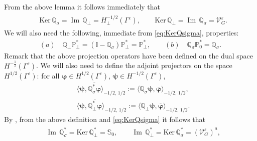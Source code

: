\documentclass[]{article}
\newtheorem{proposition}{Proposition}
\numberwithin{equation}{section}
\numberwithin{theorem}{section}
\numberwithin{lemma}{section}
\numberwithin{corollary}{section}
\numberwithin{proposition}{section}
\numberwithin{definition}{section}
\newcommand{\re}{\varepsilon}
\renewcommand{\vec}{\boldsymbol}
\renewcommand{\Im}{\operatorname{Im}}
\begin{document}
	From the above lemma it follows immediately that 
	\begin{align}
		\label{eq:KerQsigma}
		\begin{split}
			&\text{Ker} \, \mathbb{Q}_{\sigma} = \Im \, \mathbb{Q}_{\perp} = H^{-1/2}_{\perp}(\Gamma^{\re}), \qquad  \text{Ker} \, \mathbb{Q}_{\perp} = \Im \, \mathbb{Q}_{\sigma} = \mathcal{V}^{\re}_G.
		\end{split}
	\end{align}
	We will also need the following, immediate from  \eqref{eq:KerQsigma}, properties:
	\begin{align}
		\label{eq:qperp_pperp}
		(a)\quad	\mathbb{Q}_{\perp}\mathbb{P}_{\perp}^*=(\mathbb{I}-\mathbb{Q}_{\sigma})\mathbb{P}_{\perp}^*=\mathbb{P}_{\perp}^*,\qquad 
		(b)\quad \mathbb{Q}_{\sigma}\mathbb{P}_{0}^*=\mathbb{Q}_{\sigma}.
	\end{align}
	Remark that the above projection operators have been defined on the dual space $H^{-\frac{1}{2}}(\Gamma^{\re})$. We will also need to define the adjoint projectors on the space $H^{1/2}(\Gamma^{\re})$: for all  $\vec{\varphi}\in H^{1/2}(\Gamma^{\re}), \, \vec{\psi}\in H^{-1/2}(\Gamma^{\re})$, 
	\begin{align*}%
		&\langle \vec{\psi}, \overline{\mathbb{Q}^{*}_{\sigma} \vec{\varphi}} \rangle_{-1/2, \, 1/2} := \langle \mathbb{Q}_{\sigma} \vec{\psi},  \overline{\vec{\varphi}} \rangle_{-1/2, \, 1/2}, \\
		&\langle \vec{\psi}, \overline{\mathbb{Q}^{*}_{\perp} \vec{\varphi}} \rangle_{-1/2, \, 1/2} := \langle \mathbb{Q}_{\perp} \vec{\psi},  \overline{\vec{\varphi}} \rangle_{-1/2, \, 1/2}.
	\end{align*}
	By \cite[p. 23, Lemma 2.10]{mclean}, from the above definition and \eqref{eq:KerQsigma} it follows that 
	\begin{align}
		\label{eq:kerqperp}
		\begin{split}
			&\Im \, \mathbb{Q}^*_{\sigma} = \text{Ker} \, \mathbb{Q}^*_{\perp} = \mathbb{S}_0, \qquad \Im \, \mathbb{Q}^*_{\perp} = \text{Ker} \, \mathbb{Q}^*_{\sigma} =  ( \mathcal{V}^{\re}_G )^a,
		\end{split}
	\end{align}
\end{document}
